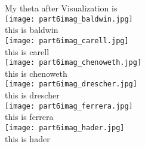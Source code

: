 \documentclass[12pt]{article}
\begin{document}
My theta after Visualization is \\
\texttt{[image: part6imag\_baldwin.jpg]}\\
this is  baldwin\\
\texttt{[image: part6imag\_carell.jpg]}\\
this is  carell\\
\texttt{[image: part6imag\_chenoweth.jpg]}\\
this is  chenoweth\\
\texttt{[image: part6imag\_drescher.jpg]}\\
this is  drescher\\
\texttt{[image: part6imag\_ferrera.jpg]}\\
this is  ferrera\\
\texttt{[image: part6imag\_hader.jpg]}\\
this is  hader\\




 
 
\end{document}
